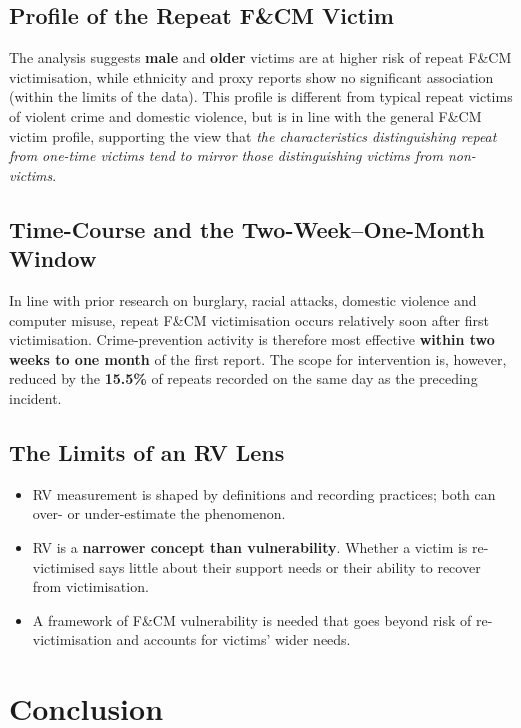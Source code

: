\documentclass[11pt,a4paper,openany]{report}
\theoremstyle{definition}
\theoremstyle{plain}
\theoremstyle{remark}
\begin{document}
\subsection{Profile of the Repeat F\&CM Victim}

The analysis suggests \textbf{male} and \textbf{older} victims are at higher risk of repeat F\&CM victimisation, while ethnicity and proxy reports show no significant association (within the limits of the data). This profile is different from typical repeat victims of violent crime and domestic violence, but is in line with the general F\&CM victim profile, supporting the view that \textit{the characteristics distinguishing repeat from one-time victims tend to mirror those distinguishing victims from non-victims}.

\subsection{Time-Course and the Two-Week--One-Month Window}

In line with prior research on burglary, racial attacks, domestic violence and computer misuse, repeat F\&CM victimisation occurs relatively soon after first victimisation. Crime-prevention activity is therefore most effective \textbf{within two weeks to one month} of the first report. The scope for intervention is, however, reduced by the \textbf{15.5\%} of repeats recorded on the same day as the preceding incident.

\subsection{The Limits of an RV Lens}

\begin{itemize}
    \item RV measurement is shaped by definitions and recording practices; both can over- or under-estimate the phenomenon.
    \item RV is a \textbf{narrower concept than vulnerability}. Whether a victim is re-victimised says little about their support needs or their ability to recover from victimisation.
    \item A framework of F\&CM vulnerability is needed that goes beyond risk of re-victimisation and accounts for victims' wider needs.
\end{itemize}

\section{Conclusion}
\end{document}
